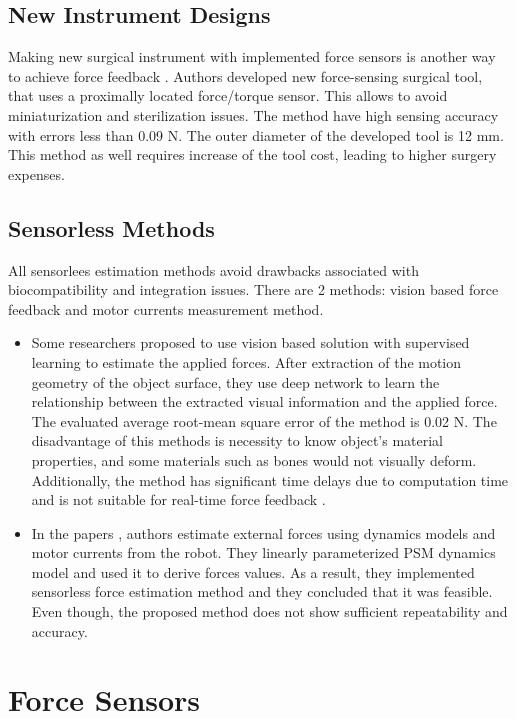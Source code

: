 \subsection{New Instrument Designs}
Making new surgical instrument with implemented force sensors is another way to achieve force feedback \cite{schwalb_forcesensing_2017}. Authors developed new force-sensing surgical tool, that uses a proximally located force/torque sensor. This allows to avoid miniaturization and sterilization issues. The method have high sensing accuracy with errors less than 0.09 N. The outer diameter of the developed tool is 12 mm. This method as well requires increase of the tool cost, leading to higher surgery expenses.

\subsection{Sensorless Methods}

All sensorlees estimation methods avoid drawbacks associated with biocompatibility and integration issues. There are 2 methods: vision based force feedback and motor currents measurement method.

\begin{itemize}
\item Some researchers proposed to use vision based solution with supervised learning to estimate the applied forces. After extraction of the motion geometry of the object surface, they use deep network to learn the relationship between the extracted visual information and the applied force. The evaluated average root-mean square error of the method is 0.02 N.  The disadvantage of this methods is necessity to know object’s material properties, and some materials such as bones would not visually deform. Additionally, the method has significant time delays due to computation time and is not suitable for real-time force feedback \cite{aviles_towards_2017}. 

\item In the papers \cite{sang_hongqiang_external_2017, yoon_design_2015}, authors estimate external forces using dynamics models and motor currents from the robot. They linearly parameterized PSM dynamics model and used it to derive forces values. As a result, they implemented sensorless force estimation method and they concluded that it was feasible. Even though, the proposed method does not show sufficient repeatability and accuracy.
\end{itemize}

\section{Force Sensors}
\label{sec:ForceSensors}

